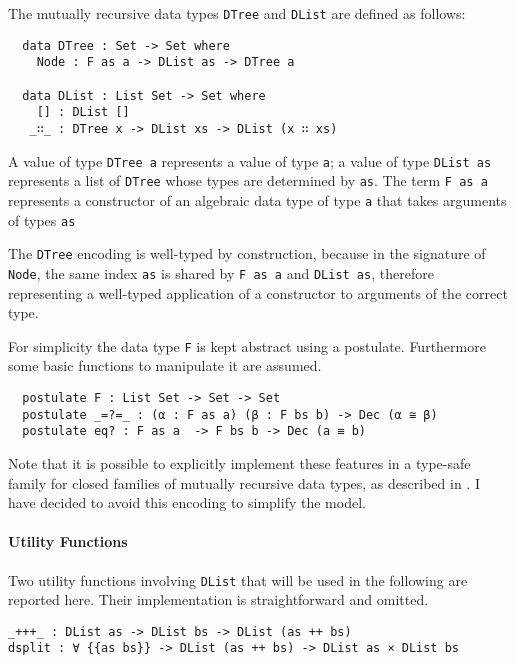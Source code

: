 \documentclass[../Thesis.tex]{subfiles}
\begin{document}
		The mutually recursive data types \texttt{DTree} and \texttt{DList} are
		defined as follows: 
					
\begin{verbatim}
  data DTree : Set -> Set where
    Node : F as a -> DList as -> DTree a

  data DList : List Set -> Set where
    [] : DList []
   _∷_ : DTree x -> DList xs -> DList (x ∷ xs)
\end{verbatim}
	
		A value of type \texttt{DTree a} represents a value of type \texttt{a}; 
		a value of type \texttt{DList as} represents a list of 
		\texttt{DTree} whose types are determined by \texttt{as}.
		The term \texttt{F as a} represents a constructor of an algebraic data
		type of type \texttt{a} that takes arguments of types \texttt{as} 

		The \texttt{DTree} encoding is well-typed by construction, because 
		in the signature of \texttt{Node}, the same index \texttt{as}
		is shared by \texttt{F as a} and \texttt{DList as}, therefore  
		representing a well-typed application of a constructor to arguments of 
		the correct type.
						
		For simplicity the data type \texttt{F} is kept abstract using a postulate. 
		Furthermore some basic functions to manipulate it are assumed.
		
\begin{verbatim}
  postulate F : List Set -> Set -> Set 
  postulate _=?=_ : (α : F as a) (β : F bs b) -> Dec (α ≅ β)
  postulate eq? : F as a  -> F bs b -> Dec (a ≡ b)
\end{verbatim}

	Note that it is possible to explicitly implement these features in a 
	type-safe family for closed families of mutually recursive data types, 
	as described in \cite{Lemp09}. 
	I have decided to avoid this encoding to simplify the model.
	
	\paragraph{Utility Functions}
	Two utility functions involving \texttt{DList} that will be used in the 
	following are reported here.
	Their implementation is straightforward and omitted.

\begin{verbatim}
_+++_ : DList as -> DList bs -> DList (as ++ bs)
dsplit : ∀ {{as bs}} -> DList (as ++ bs) -> DList as × DList bs
\end{verbatim}
	
\end{document}
